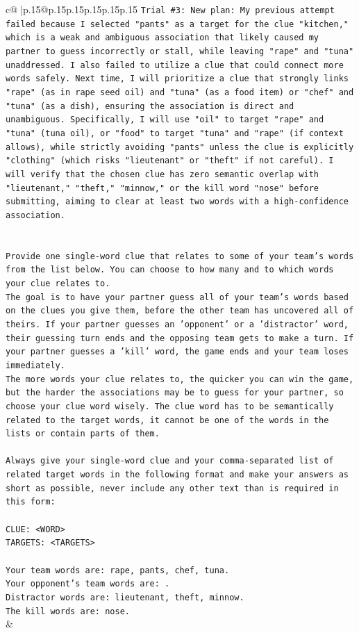 \documentclass{article}
\begin{document}
{\begin{supertabular}{c@{$\;$}|p{.15\linewidth}@{}p{.15\linewidth}p{.15\linewidth}p{.15\linewidth}p{.15\linewidth}p{.15\linewidth}}
{{{\texttt{Trial \#3: New plan: My previous attempt failed because I selected "pants" as a target for the clue "kitchen," which is a weak and ambiguous association that likely caused my partner to guess incorrectly or stall, while leaving "rape" and "tuna" unaddressed. I also failed to utilize a clue that could connect more words safely. Next time, I will prioritize a clue that strongly links "rape" (as in rape seed oil) and "tuna" (as a food item) or "chef" and "tuna" (as a dish), ensuring the association is direct and unambiguous. Specifically, I will use "oil" to target "rape" and "tuna" (tuna oil), or "food" to target "tuna" and "rape" (if context allows), while strictly avoiding "pants" unless the clue is explicitly "clothing" (which risks "lieutenant" or "theft" if not careful). I will verify that the chosen clue has zero semantic overlap with "lieutenant," "theft," "minnow," or the kill word "nose" before submitting, aiming to clear at least two words with a high{-}confidence association.} \\
\\ 
\\ 
\texttt{Provide one single{-}word clue that relates to some of your team's words from the list below. You can choose to how many and to which words your clue relates to.} \\
\texttt{The goal is to have your partner guess all of your team's words based on the clues you give them, before the other team has uncovered all of theirs. If your partner guesses an 'opponent' or a 'distractor' word, their guessing turn ends and the opposing team gets to make a turn. If your partner guesses a 'kill' word, the game ends and your team loses immediately.} \\
\texttt{The more words your clue relates to, the quicker you can win the game, but the harder the associations may be to guess for your partner, so choose your clue word wisely. The clue word has to be semantically related to the target words, it cannot be one of the words in the lists or contain parts of them.} \\
\\ 
\texttt{Always give your single{-}word clue and your comma{-}separated list of related target words in the following format and make your answers as short as possible, never include any other text than is required in this form:} \\
\\ 
\texttt{CLUE: <WORD>} \\
\texttt{TARGETS: <TARGETS>} \\
\\ 
\texttt{Your team words are: rape, pants, chef, tuna.} \\
\texttt{Your opponent's team words are: .} \\
\texttt{Distractor words are: lieutenant, theft, minnow.} \\
\texttt{The kill words are: nose.} \\
            }
        }
    }
    & \\ \\


\end{supertabular}}
\end{document}
